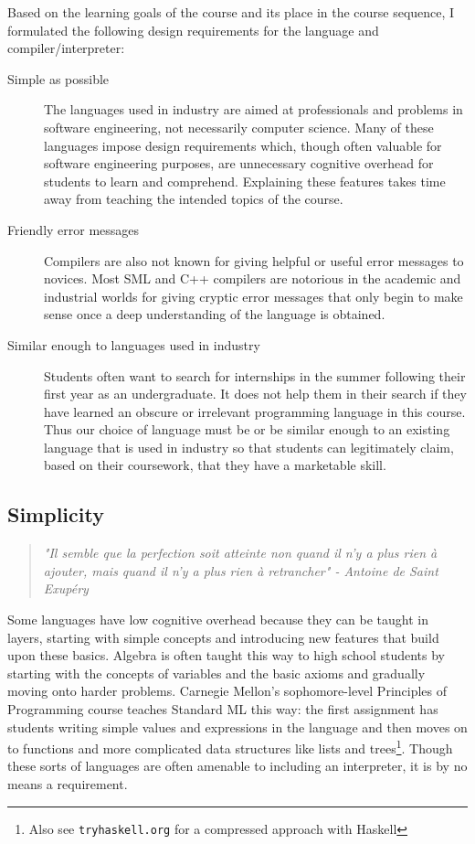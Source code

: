 Based on the learning goals of the course and its place in the course sequence,
I formulated the following design requirements for the language and
compiler/interpreter:

\begin{description}

\item[Simple as possible] The languages used in industry are aimed at
professionals and problems in software engineering, not necessarily computer
science. Many of these languages impose design requirements which, though often
valuable for software engineering purposes, are unnecessary cognitive overhead
for students to learn and comprehend. Explaining these features takes time away
from teaching the intended topics of the course.

\item[Friendly error messages]
Compilers are also not known for giving helpful or useful
error messages to novices. Most SML and C++ compilers are notorious in the
academic and industrial worlds for giving cryptic error messages that only
begin to make sense once a deep understanding of the language is obtained.

\item[Similar enough to languages used in industry] Students often want to
search for internships in the summer following their first year as an
undergraduate. It does not help them in their search if they have learned an
obscure or irrelevant programming language in this course. Thus our choice of
language must be or be similar enough to an existing language that is used in
industry so that students can legitimately claim, based on their coursework,
that they have a marketable skill.

\end{description}

\subsection{Simplicity}
\begin{quote}
{\it "Il semble que la perfection soit atteinte non quand il n'y a plus
rien \`a ajouter, mais quand il n'y a plus rien \`a retrancher" - Antoine de Saint
Exup\'ery}
\end{quote}

Some languages have low cognitive overhead because they can be taught in
layers, starting with simple concepts and introducing new features that build
upon these basics.  Algebra is often taught this way to high school students by
starting with the concepts of variables and the basic axioms and gradually
moving onto harder problems.  Carnegie Mellon's sophomore-level Principles of
Programming course teaches Standard ML this way: the first assignment has
students writing simple values and expressions in the language and then moves
on to functions and more complicated data structures like lists and
trees\footnote{Also see {\tt tryhaskell.org} for a compressed approach with
Haskell}.  Though these sorts of languages are often amenable to including an
interpreter, it is by no means a requirement.

